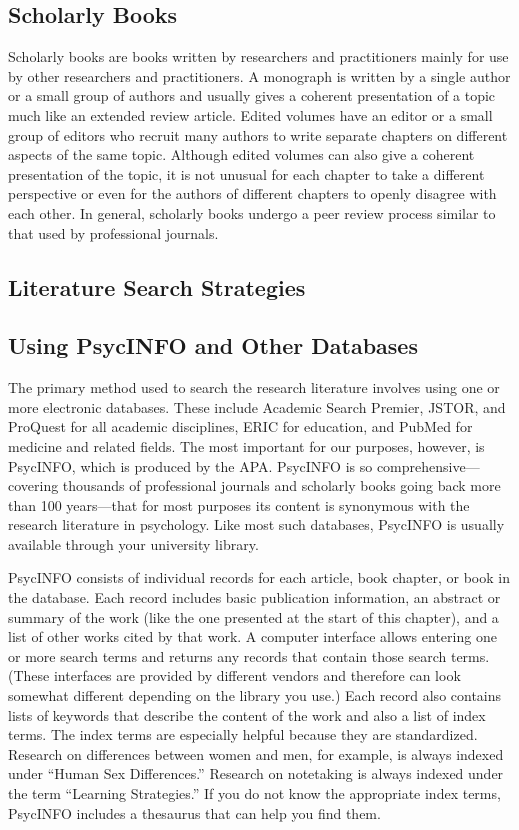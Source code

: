 \documentclass[]{book}
\theoremstyle{definition}
\theoremstyle{definition}
\theoremstyle{remark}
\begin{document}
\subsection{Scholarly Books}\label{scholarly-books}

Scholarly books are books written by researchers and practitioners
mainly for use by other researchers and practitioners. A monograph is
written by a single author or a small group of authors and usually gives
a coherent presentation of a topic much like an extended review article.
Edited volumes have an editor or a small group of editors who recruit
many authors to write separate chapters on different aspects of the same
topic. Although edited volumes can also give a coherent presentation of
the topic, it is not unusual for each chapter to take a different
perspective or even for the authors of different chapters to openly
disagree with each other. In general, scholarly books undergo a peer
review process similar to that used by professional journals.

\subsection{Literature Search
Strategies}\label{literature-search-strategies}

\subsection{Using PsycINFO and Other
Databases}\label{using-psycinfo-and-other-databases}

The primary method used to search the research literature involves using
one or more electronic databases. These include Academic Search Premier,
JSTOR, and ProQuest for all academic disciplines, ERIC for education,
and PubMed for medicine and related fields. The most important for our
purposes, however, is PsycINFO, which is produced by the APA. PsycINFO
is so comprehensive---covering thousands of professional journals and
scholarly books going back more than 100 years---that for most purposes
its content is synonymous with the research literature in psychology.
Like most such databases, PsycINFO is usually available through your
university library.

PsycINFO consists of individual records for each article, book chapter,
or book in the database. Each record includes basic publication
information, an abstract or summary of the work (like the one presented
at the start of this chapter), and a list of other works cited by that
work. A computer interface allows entering one or more search terms and
returns any records that contain those search terms. (These interfaces
are provided by different vendors and therefore can look somewhat
different depending on the library you use.) Each record also contains
lists of keywords that describe the content of the work and also a list
of index terms. The index terms are especially helpful because they are
standardized. Research on differences between women and men, for
example, is always indexed under ``Human Sex Differences.'' Research on
notetaking is always indexed under the term ``Learning Strategies.'' If
you do not know the appropriate index terms, PsycINFO includes a
thesaurus that can help you find them.
\end{document}
